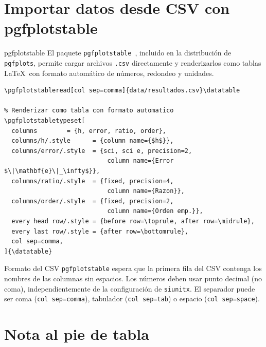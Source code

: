 \section{Importar datos desde CSV con pgfplotstable}
\label{sec:pgfplotstable}

\begin{definicion}{pgfplotstable}
\label{def:pgfplotstable}
El paquete \texttt{pgfplotstable}~\cite{pgfplotstable2023}, incluido en la
distribución de \texttt{pgfplots}, permite cargar archivos \texttt{.csv}
directamente y renderizarlos como tablas \LaTeX\ con formato automático
de números, redondeo y unidades.
\end{definicion}

\begin{lstlisting}[style=latex, frame=none, numbers=none]
% Cargar el archivo una vez (en el preambulo o en el capitulo)
\pgfplotstableread[col sep=comma]{data/resultados.csv}\datatable

% Renderizar como tabla con formato automatico
\pgfplotstabletypeset[
  columns        = {h, error, ratio, order},
  columns/h/.style      = {column name={$h$}},
  columns/error/.style  = {sci, sci e, precision=2,
                            column name={Error $\|\mathbf{e}\|_\infty$}},
  columns/ratio/.style  = {fixed, precision=4,
                            column name={Razon}},
  columns/order/.style  = {fixed, precision=2,
                            column name={Orden emp.}},
  every head row/.style = {before row=\toprule, after row=\midrule},
  every last row/.style = {after row=\bottomrule},
  col sep=comma,
]{\datatable}
\end{lstlisting}

\begin{observacion}{Formato del CSV}
\texttt{pgfplotstable} espera que la primera fila del CSV contenga los
nombres de las columnas sin espacios. Los números deben usar punto decimal
(no coma), independientemente de la configuración de \texttt{siunitx}.
El separador puede ser coma (\texttt{col sep=comma}), tabulador
(\texttt{col sep=tab}) o espacio (\texttt{col sep=space}).
\end{observacion}

\section{Nota al pie de tabla}
\label{sec:tablenote}

